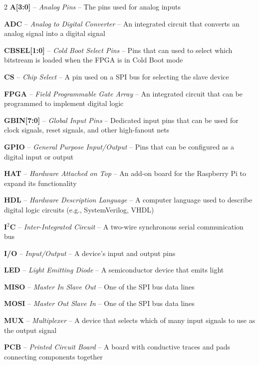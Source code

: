 \begin{multicols}{2}
    \textbf{A[3:0]} -- \textit{Analog Pins} -- The pins used for analog inputs

    \textbf{ADC} -- \textit{Analog to Digital Converter} -- An integrated circuit that converts an analog signal into a digital signal
    
    \textbf{CBSEL[1:0]} -- \textit{Cold Boot Select Pins} -- Pins that can used to select which bitstream is loaded when the FPGA is in Cold Boot mode

    \textbf{CS} -- \textit{Chip Select} -- A pin used on a SPI bus for selecting the slave device

    \textbf{FPGA} -- \textit{Field Programmable Gate Array} -- An integrated circuit that can be programmed to implement digital logic

    \textbf{GBIN[7:0]} -- \textit{Global Input Pins} -- Dedicated input pins that can be used for clock signals, reset signals, and other high-fanout nets

    \textbf{GPIO} -- \textit{General Purpose Input/Output} -- Pins that can be configured as a digital input or output

    \textbf{HAT} -- \textit{Hardware Attached on Top} -- An add-on board for the Raspberry Pi to expand its functionality

    \textbf{HDL} -- \textit{Hardware Description Language} -- A computer language used to describe digital logic circuits (e.g., SystemVerilog, VHDL)
    
    \textbf{I$^2$C} -- \textit{Inter-Integrated Circuit} -- A two-wire synchronous serial communication bus

    \textbf{I/O} -- \textit{Input/Output} -- A device's input and output pins

    \textbf{LED} -- \textit{Light Emitting Diode} -- A semiconductor device that emits light

    \textbf{MISO} -- \textit{Master In Slave Out} -- One of the SPI bus data lines

    \textbf{MOSI} -- \textit{Master Out Slave In} -- One of the SPI bus data lines

    \textbf{MUX} -- \textit{Multiplexer} -- A device that selects which of many input signals to use as the output signal

    \textbf{PCB} -- \textit{Printed Circuit Board} -- A board with conductive traces and pads connecting components together

    \vfill\null


\end{multicols}
